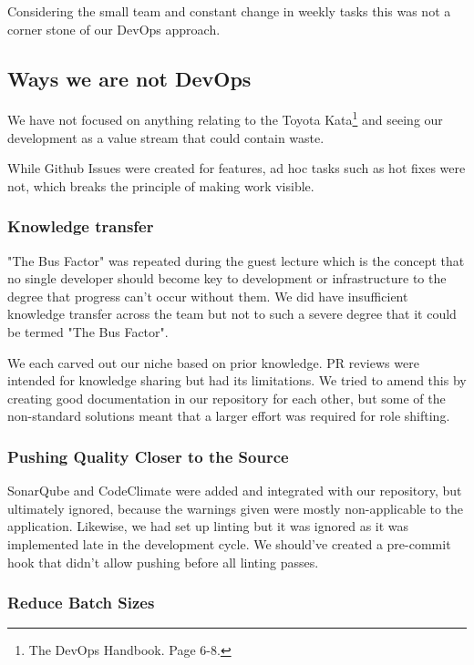 \documentclass{article}
\begin{document}
Considering the small team and constant change in weekly tasks this was not a corner stone of our DevOps approach. 

\subsection{Ways we are not DevOps}

We have not focused on anything relating to the Toyota Kata\footnote{ The DevOps Handbook. Page 6-8.} and seeing our development as a value stream that could contain waste. 

While Github Issues were created for features, ad hoc tasks such as hot fixes were not, which breaks the principle of making work visible. 

\subsubsection{Knowledge transfer}

"The Bus Factor" was repeated during the guest lecture which is the concept that no single developer should become key to development or infrastructure to the degree that progress can't occur without them. We did have insufficient knowledge transfer across the team but not to such a severe degree that it could be termed "The Bus Factor".

We each carved out our niche based on prior knowledge. PR reviews were intended for knowledge sharing but had its limitations. We tried to amend this by creating good documentation in our repository for each other, but some of the non-standard solutions meant that a larger effort was required for role shifting.  

\subsubsection{Pushing Quality Closer to the Source}

SonarQube and CodeClimate were added and integrated with our repository, but ultimately ignored, because the warnings given were mostly non-applicable to the application. Likewise, we had set up linting but it was ignored as it was implemented late in the development cycle. We should've created a pre-commit hook that didn't allow pushing before all linting passes. 

\subsubsection{Reduce Batch Sizes}
\end{document}
